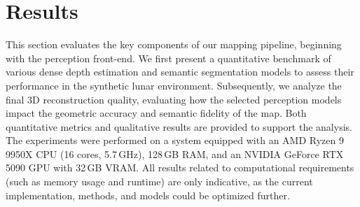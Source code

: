 \section{Results}
\label{sec:results}
This section evaluates the key components of our mapping pipeline, beginning with the perception front-end. We first present a quantitative benchmark of various dense depth estimation and semantic segmentation models to assess their performance in the synthetic lunar environment. Subsequently, we analyze the final 3D reconstruction quality, evaluating how the selected perception models impact the geometric accuracy and semantic fidelity of the map. Both quantitative metrics and qualitative results are provided to support the analysis.
The experiments were performed on a system equipped with an AMD Ryzen 9 9950X CPU (16 cores, 5.7\,GHz), 128\,GB RAM, and an NVIDIA GeForce RTX 5090 GPU with 32\,GB VRAM.
All results related to computational requirements (such as memory usage and runtime) are only indicative, as the current implementation, methods, and models could be optimized further.





